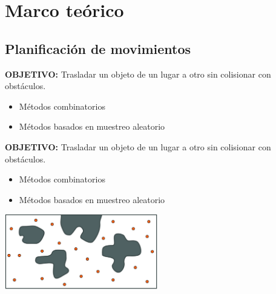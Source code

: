\documentclass[10pt]{beamer}
\begin{document}
\section{Marco teórico}

\subsection{Planificación de movimientos}

\begin{frame}
	\textbf{OBJETIVO:} Trasladar un objeto de un lugar a otro sin colisionar con obstáculos.
	
	\begin{itemize}
		\item Métodos combinatorios		
		\item Métodos basados en muestreo aleatorio
		
	\end{itemize}		
\end{frame}

\begin{frame}\addtocounter{framenumber}{-1}
	\vspace{1.5cm}
	\textbf{OBJETIVO:} Trasladar un objeto de un lugar a otro sin colisionar con obstáculos.
	
	\begin{itemize}
		\item Métodos combinatorios		
		\item Métodos basados en muestreo aleatorio		
	\end{itemize}		
	\begin{center}
		\includegraphics[width=0.5\textwidth,keepaspectratio]{prm_1}
	\end{center}
	
\end{frame}
\end{document}
